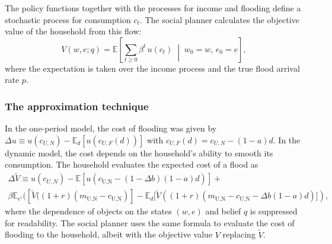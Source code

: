\documentclass[12pt]{article}
\begin{document}
The policy functions together with the processes for income and flooding define a stochastic process for consumption $c_t$. The social planner calculates the objective value of the household from this flow: 
\begin{equation}
V(w,e;q)=\mathbb{E}\!\left[\textstyle\sum_{t\geq0}\beta^{t}\,u(c_t)\;\middle|\;w_0=w,\,e_0=e\right],
\label{eq:objective_dyn}
\end{equation}
where the expectation is taken over the income process and the true flood arrival rate $p$.





\subsubsection{The approximation technique}

In the one-period model, the cost of flooding was given by $\Delta u \equiv u(c_{U,N})-\mathbb{E}_d[u(c_{U,F}(d))]$ with $c_{U,F}(d)=c_{U,N}-(1-a)d$. In the dynamic model, the cost depends on the household's ability to smooth its consumption. The household evaluates the expected cost of a flood as \begin{align}
\Delta \tilde{V} \equiv u(c_{U,N})-\mathbb{E}[u(c_{\text{U,N}}-(1-\Delta b)(1-a)d)]+ \nonumber \\ \beta\mathbb{E}_{e'}([\tilde{V}((1+r)(m_\text{U,N}-c_\text{U,N})]-\mathbb{E}_{d}[\tilde{V}((1+r)(m_\text{U,N}-c_\text{U,N}-\Delta b(1-a)d)]),
\end{align}
where the dependence of objects on the states $(w,e)$ and belief $q$ is suppressed for readability. The social planner uses the same formula to evaluate the cost of flooding to the household, albeit with the objective value $V$ replacing $\tilde{V}$.
\end{document}
